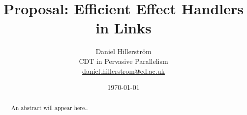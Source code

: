 \documentclass[a4paper,11pt,twoside]{article}
\author{Daniel Hillerström\\\small{CDT in Pervasive Parallelism}\\\small{\href{mailto:daniel.hillerstrom@ed.ac.uk}{daniel.hillerstrom@ed.ac.uk}}}
\date{\today}
\title{Proposal: Efficient Effect Handlers in Links} %
\begin{document}
  \maketitle
  \begin{abstract}
    An abstract will appear here\dots
  \end{abstract}
  
  \printbibliography[heading=bibintoc]
\end{document}
